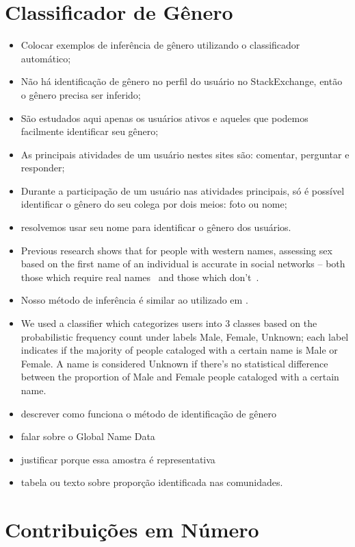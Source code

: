 \section{Classificador de Gênero} %
\label{sub:classificador_de_g_nero}
\begin{itemize}
	\item Colocar exemplos de inferência de gênero utilizando o classificador automático;
	\item Não há identificação de gênero no perfil do usuário no StackExchange, então o gênero precisa ser inferido;
	\item São estudados aqui apenas os usuários ativos e aqueles que podemos facilmente identificar seu gênero;
	\item As principais atividades de um usuário nestes sites são: comentar, perguntar e responder;
	\item Durante a participação de um usuário nas atividades principais, só é possível identificar o gênero do seu colega por dois meios: foto ou nome;
	\item resolvemos usar seu nome para identificar o gênero dos usuários.
	\item Previous research shows that for people with western names, assessing sex based on the first name of an individual is accurate in social networks -- both those which require real names~\cite{tang2011s} and those which don't~\cite{burger2011discriminating}\cite{liu2013s}. 
	\item Nosso método de inferência é similar ao utilizado em \cite{cunha2014he}.
	\item We used a classifier which categorizes users into 3 classes based on the probabilistic frequency count under labels Male, Female, Unknown; each label indicates if the majority of people cataloged with a certain name is Male or Female. A name is considered Unknown if there’s no statistical difference between the proportion of Male and Female people cataloged with a certain name.
	\item descrever como funciona o método de identificação de gênero
	\item falar sobre o Global Name Data
	\item justificar porque essa amostra é representativa
	\item tabela ou texto sobre proporção identificada nas comunidades.
\end{itemize}


\section{Contribuições em Número} %
\label{sub:contribui_es_em_numero}


